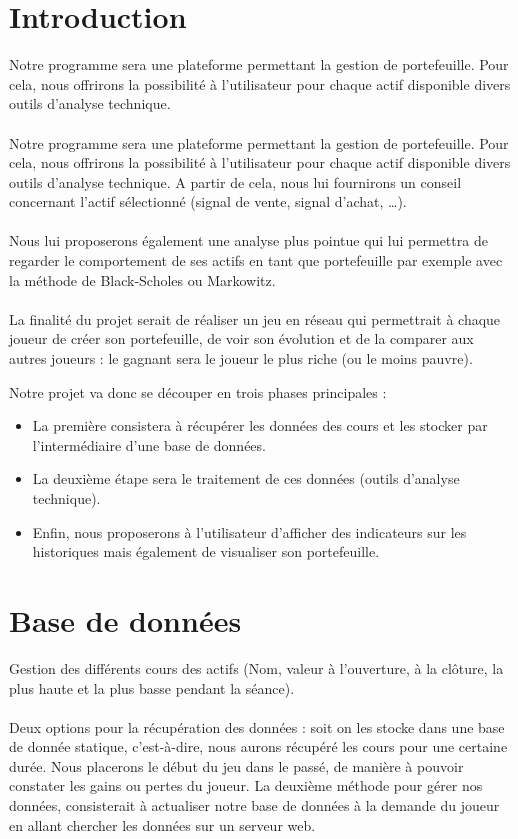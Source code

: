 \section{Introduction}

Notre programme sera une plateforme permettant la gestion de portefeuille. Pour cela, nous offrirons la possibilité à l’utilisateur pour chaque actif disponible divers outils d’analyse technique. \\ \\


Notre programme sera une plateforme permettant la gestion de portefeuille. Pour cela, nous offrirons la possibilité à l’utilisateur pour chaque actif disponible divers outils d’analyse technique. A partir de cela, nous lui fournirons un conseil concernant l’actif sélectionné (signal de vente, signal d’achat, …). \\ \\
	Nous lui proposerons également une analyse plus pointue qui lui permettra de regarder le comportement de ses actifs en tant que portefeuille par exemple avec la méthode de Black-Scholes ou Markowitz. \\ \\
	La finalité du projet serait de réaliser un jeu en réseau qui permettrait à chaque joueur de créer son portefeuille, de voir son évolution et de la comparer aux autres joueurs : le gagnant sera le joueur le plus riche (ou le moins pauvre). 


Notre projet va donc se découper en trois phases principales : 
\begin{itemize}
\item La première consistera à récupérer les données des cours et les stocker par l’intermédiaire d’une base de données.
\item La deuxième étape sera le traitement de ces données (outils d’analyse technique).
\item Enfin, nous proposerons à l’utilisateur d'afficher des indicateurs sur les historiques mais également de visualiser son portefeuille. 
\end{itemize}



\section{Base de données}
Gestion des différents cours des actifs (Nom, valeur à l’ouverture, à la clôture, la plus haute et la plus basse pendant la séance). \\ \\ 
Deux options pour la récupération des données : soit on les stocke dans une base de donnée statique, c’est-à-dire, nous aurons récupéré les cours pour une certaine durée. Nous placerons le début du jeu dans le passé, de manière à pouvoir constater les gains ou pertes du joueur. La deuxième méthode pour gérer nos données, consisterait à actualiser notre base de données à la demande du joueur en allant chercher les données sur un serveur web. 

